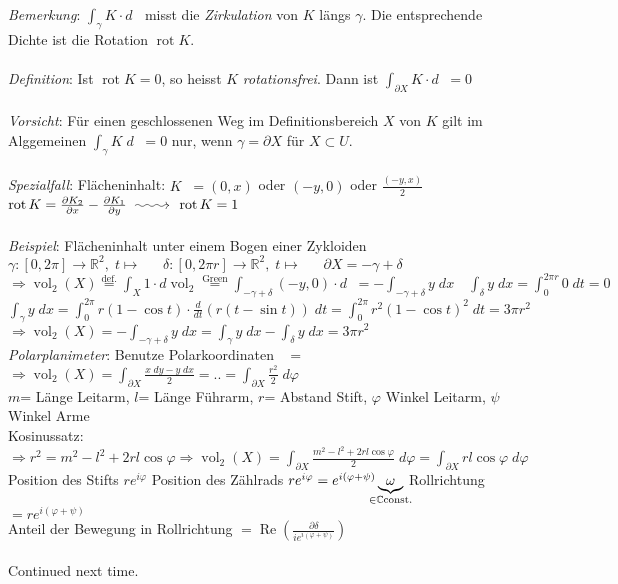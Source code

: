 \documentclass[12pt,a4paper,titlepage]{article}
\makeatletter
\newcommand{\longsquiggly}{\xymatrix{{}\ar@{~>}[r]&{}}}
\renewcommand{\Re}{\operatorname{Re}}
\renewcommand{\d}{\partial}
\newcommand{\setC}{\mathbb{C}}
\newcommand{\setR}{\mathbb{R}}
\newcommand{\vol}{\operatorname{vol}}
\newcommand{\rot}{\operatorname{rot}}
\newcommand{\twovec}[2]{\mathop{\left(\substack{#1 \\ #2}\right)}}
\makeatother
\begin{document}
\noindent\textit{Bemerkung}: $\int_\gamma K\cdot d\twovec{x}{y}$ misst die \emph{Zirkulation} von $K$ längs $\gamma$. Die entsprechende Dichte ist die Rotation $\rot K$. \\
\\
\textit{Definition}: Ist $\rot K=0$, so heisst $K$ \emph{rotationsfrei}. Dann ist $\int_{\d X}K\cdot d\twovec{x}{y}=0$ \\
\\
\textit{Vorsicht}: Für einen geschlossenen Weg im Definitionsbereich $X$ von $K$ gilt im Alggemeinen $\int_\gamma K \;d\twovec{x}{y}=0$ nur, wenn $\gamma=\d X$ für $X\subset U$. \\
\\
\textit{Spezialfall}: Flächeninhalt: $K\twovec{x}{y}=(0,x)$ oder $(-y,0)$ oder $\frac{(-y,x)}{2}$ \\
$\rot K=\frac{\d K_2}{\d x}-\frac{\d K_1}{\d y} \longsquiggly \rot K=1$ \\
\\
\textit{Beispiel}: Flächeninhalt unter einem Bogen einer Zykloiden \\
$\gamma:[0,2\pi]\to\setR^2,\;t\mapsto\twovec{r(t-\sin t)}{r(1-\cos t)} \quad \delta:[0,2\pi r]\to\setR^2,\;t\mapsto\twovec{t}{0} \quad \d X=-\gamma+\delta$ \\
$\Rightarrow \vol_2(X)\overset{\text{def.}}{=}\int_X1\cdot d\vol_2\overset{\text{Green}}{=}\int_{-\gamma+\delta}(-y,0)\cdot d\twovec{x}{y} = -\int_{-\gamma+\delta}y \;dx \quad \int_\delta y \;dx=\int_0^{2\pi r}0 \;dt=0$ \\
$\int_\gamma y \;dx =\int_0^{2\pi}r(1-\cos t)\cdot\frac{d}{dt}(r(t-\sin t)) \;dt = \int_0^{2\pi}r^2(1-\cos t)^2 \;dt=3\pi r^2$ \\
$\Rightarrow \vol_2(X)=-\int_{-\gamma+\delta}y \;dx=\int_\gamma y \;dx-\int_\delta y \;dx=3\pi r^2$ \\
\newpage\noindent
\textit{Polarplanimeter}: Benutze Polarkoordinaten $\twovec{x}{y}=\twovec{r\cos\varphi}{r\sin\varphi}$ \\
$\Rightarrow \vol_2(X)=\int_{\d X}\frac{x\;dy-y\;dx}{2} = .. = \int_{\d X}\frac{r^2}{2} \;d\varphi$ \\
$m$= Länge Leitarm, $l$= Länge Führarm, $r$= Abstand Stift, $\varphi$ Winkel Leitarm, $\psi$ Winkel Arme \\
Kosinussatz: $\Rightarrow r^2=m^2-l^2+2rl\cos\varphi \Rightarrow \vol_2(X)=\int_{\d X}\frac{m^2-l^2+2rl\cos\varphi}{2}\;d\varphi = \int_{\d X}rl\cos\varphi \;d\varphi$  \\
Position des Stifts $re^{i\varphi}$ \quad Position des Zählrads $re^{i\varphi}=e^{i(\varphi+\psi)}\underbrace{\omega}_{\mathclap{\in\setC \text{const}.}}$ \quad Rollrichtung $=re^{i(\varphi+\psi)}$ \\
Anteil der Bewegung in Rollrichtung $=\Re(\frac{\d\delta}{ie^{i(\varphi+\psi)}})$ \\
\\
Continued next time.
\end{document}
